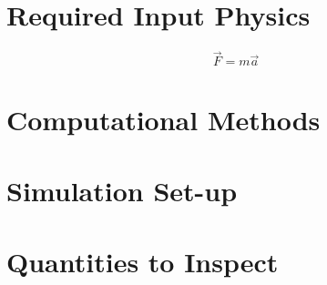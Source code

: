 \documentclass[a4paper,12pt]{article} %
\numberwithin{equation}{section} %
\numberwithin{figure}{section} %
\begin{document}
\newpage

\section{Required Input Physics}

$$\vec{F} = m \vec{a}$$

\newpage

\section{Computational Methods}

\newpage

\section{Simulation Set-up}

\newpage

\section{Quantities to Inspect}

\newpage


\end{document}
